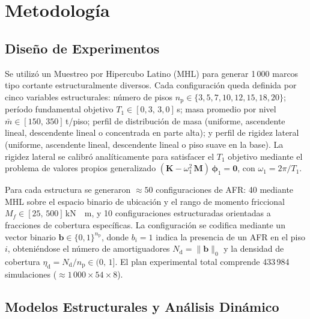 \documentclass[preprint,12pt,authoryear]{elsarticle}
\newcommand{\nd}{N_{\mathrm{d}}}
\newcommand{\np}{n_{\mathrm{p}}}              %
\newcommand{\etad}{\eta_{\mathrm{d}}}
\newcommand{\Mf}{M_{\!f}}
\newcommand{\KM}{\,\si{kN{\cdot}m}}
\begin{document}
\section{Metodología}
\label{sec:method}

\subsection{Diseño de Experimentos}
\label{sec:method:doe}

Se utilizó un Muestreo por Hipercubo Latino (MHL) \citep{McKay1979} para generar
1\,000 marcos tipo cortante estructuralmente diversos. Cada configuración queda
definida por cinco variables estructurales: número de pisos $\np \in \{3, 5, 7,
10, 12, 15, 18, 20\}$; período fundamental objetivo $T_1 \in [0{,}3,\,3{,}0]$\,s;
masa promedio por nivel $\bar{m} \in [150,\,350]$\,t/piso; perfil de distribución
de masa (uniforme, ascendente lineal, descendente lineal o concentrada en parte
alta); y perfil de rigidez lateral (uniforme, ascendente lineal, descendente
lineal o piso suave en la base). La rigidez lateral se calibró analíticamente
para satisfacer el $T_1$ objetivo mediante el problema de valores propios
generalizado $(\bm{K} - \omega_1^2\,\bm{M})\,\bm{\phi}_1 = \bm{0}$, con
$\omega_1 = 2\pi/T_1$.

Para cada estructura se generaron $\approx 50$ configuraciones de AFR: 40
mediante MHL sobre el espacio binario de ubicación y el rango de momento
friccional $\Mf \in [25,\,500]$\KM, y 10 configuraciones estructuradas
orientadas a fracciones de cobertura específicas. La configuración se codifica
mediante un vector binario $\bm{b} \in \{0,1\}^{\np}$, donde $b_i = 1$ indica
la presencia de un AFR en el piso $i$, obteniéndose el número de amortiguadores
$\nd = \|\bm{b}\|_0$ y la densidad de cobertura $\etad = \nd/\np \in (0,\,1]$.
El plan experimental total comprende 433\,984 simulaciones
($\approx 1\,000 \times 54 \times 8$).

\subsection{Modelos Estructurales y Análisis Dinámico}
\label{sec:method:modelo}
\end{document}
